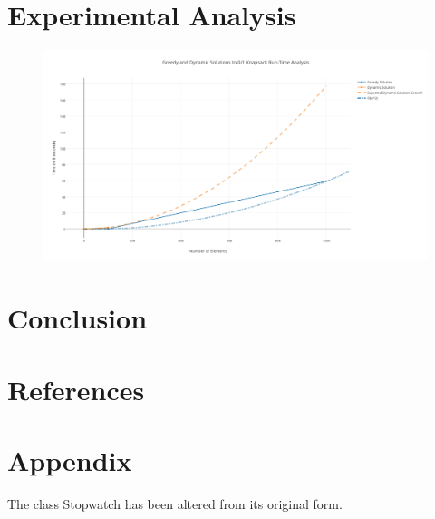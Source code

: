 \documentclass[onecolumn, 12pt, article]{IEEEtran}
\numberwithin{case}{problem}
\numberwithin{condition}{problem}
\numberwithin{condition}{subsection}
\numberwithin{definition}{section}
\theoremstyle{remark}
\numberwithin{question}{problem}
\theoremstyle{plain}
\numberwithin{answer}{problem}
\numberwithin{solution}{section}
\numberwithin{equation}{section}%
\begin{document}

\section{Experimental Analysis}
\begin{figure}[!]
\begin{center}
\includegraphics[scale=.55]{test-results.pdf}
\end{center}
\label{fig:runtime}
\end{figure}


\section{Conclusion}


\newpage

\section*{References}



\newpage

\section*{Appendix}




The class Stopwatch has been altered from its original form.
\newline




\end{document}
